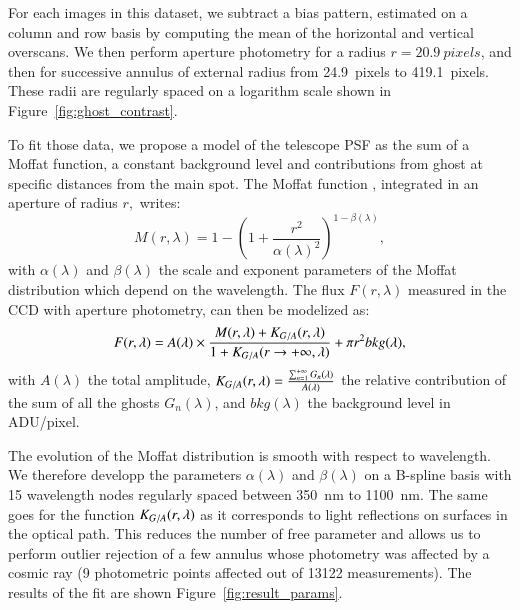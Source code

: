 For each images in this dataset, we subtract a bias pattern, estimated on a column and row basis by computing the mean of the horizontal and vertical overscans. We then perform aperture photometry for a radius $r=\SI{20.9}{pixels}$, and then for successive annulus of external radius from \SI{24.9}{pixels} to \SI{419.1}{pixels}. These radii are regularly spaced on a logarithm scale shown in Figure~\ref{fig:ghost_contrast}.

To fit those data, we propose a model of the \SD telescope PSF as the sum of a Moffat function, a constant background level and contributions from ghost at specific distances from the main spot. The Moffat function \citep{moffat}, integrated in an aperture of radius $r,$ writes:
\begin{equation}
M(r, \lambda)= 1 - \left( 1+\frac{r^2}{\alpha(\lambda)^2} \right)^{1-\beta(\lambda)},
\end{equation}
with $\alpha(\lambda)$ and $\beta(\lambda)$ the scale and exponent parameters of the Moffat distribution which depend on the wavelength. The flux $F(r, \lambda)$ measured in the CCD with aperture photometry, can then be modelized as: 
\begin{equation}
F(r, \lambda) = A(\lambda) \times \frac{M(r, \lambda) + K_{G/A}(r, \lambda)}{1 + K_{G/A}(r \rightarrow +\infty, \lambda)} + \pi r^2 bkg(\lambda),
\label{eq:moffat_model}
\end{equation}
with $A(\lambda)$ the total amplitude, $K_{G/A}(r, \lambda) = \frac{\sum_{n=1}^{+\infty} G_n(\lambda)}{A(\lambda)}$ the relative contribution of the sum of all the ghosts $G_n(\lambda)$, and $bkg(\lambda)$ the background level in ADU/pixel. 

The evolution of the Moffat distribution is smooth with respect to wavelength. We therefore developp the parameters $\alpha(\lambda)$ and $\beta(\lambda)$  on a B-spline basis with 15 wavelength nodes regularly spaced between \SI{350}{\nano\meter} to \SI{1100}{\nano\meter}. The same goes for the function $K_{G/A}(r, \lambda)$ as it corresponds to light reflections on surfaces in the optical path. This reduces the number of free parameter and allows us to perform outlier rejection of a few annulus whose photometry was affected by a cosmic ray (9 photometric points affected out of 13122 measurements). The results of the fit are shown Figure~\ref{fig:result_params}. 

